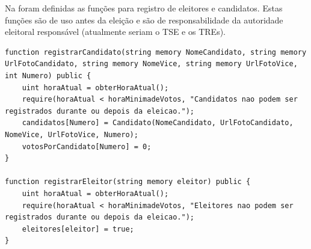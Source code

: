 \documentclass[portuguese]{textolivre}
\begin{document}
	
	
	Na  foram definidas as funções para registro de eleitores e candidatos. Estas funções são de uso antes da eleição e são de responsabilidade da autoridade eleitoral responsável (atualmente seriam o TSE e os TREs).
	
	
\begin{lstlisting}[language=Solidity, label=Codigo-registroeleitres, caption={Funções para registrar candidatos e eleitores.}, source={Autor.}]
function registrarCandidato(string memory NomeCandidato, string memory UrlFotoCandidato, string memory NomeVice, string memory UrlFotoVice, int Numero) public {
	uint horaAtual = obterHoraAtual();
	require(horaAtual < horaMinimadeVotos, "Candidatos nao podem ser registrados durante ou depois da eleicao.");
	candidatos[Numero] = Candidato(NomeCandidato, UrlFotoCandidato, NomeVice, UrlFotoVice, Numero);
	votosPorCandidato[Numero] = 0;
}

function registrarEleitor(string memory eleitor) public {
	uint horaAtual = obterHoraAtual();
	require(horaAtual < horaMinimadeVotos, "Eleitores nao podem ser registrados durante ou depois da eleicao.");
	eleitores[eleitor] = true;
}	
\end{lstlisting} %
	
\end{document}
